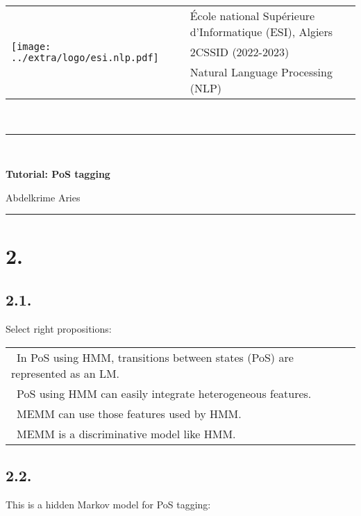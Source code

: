 \documentclass[11pt, a4paper]{article}
\begin{document}
	
	
	\noindent
	\begin{tabular}{ll}
		\multirow{3}{*}{\texttt{[image: ../extra/logo/esi.nlp.pdf]}} & 
		\'Ecole national Supérieure d'Informatique (ESI), Algiers\\
		& 2CSSID (2022-2023)\\
		& Natural Language Processing (NLP)
	\end{tabular}\\[.25cm]
	\noindent\rule{\textwidth}{2pt}\\[-0.5cm]
	\begin{center}
		{\LARGE \textbf{Tutorial: PoS tagging}}
		\begin{flushright}
			Abdelkrime Aries
		\end{flushright}
	\end{center}\vspace{-0.5cm}
	\noindent\rule{\textwidth}{2pt}


\section*{2. }

\subsection*{2.1.}

Select right propositions:

\begin{longtable}{|p{}|}
	\hline 
	\Square\ In PoS using HMM, transitions between states (PoS) are represented as an LM. \\
	\Square\ PoS using HMM can easily integrate heterogeneous features. \\	
	\Square\ MEMM can use those features used by HMM. \\
	\Square\ MEMM is a discriminative model like HMM. \\
	
	\hline
\end{longtable}

\subsection*{2.2.}

This is a hidden Markov model for PoS tagging: 
\end{document}
